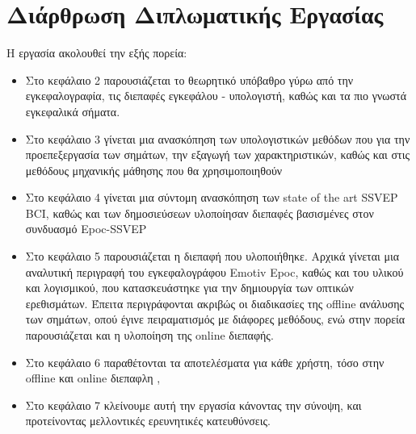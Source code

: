 \documentclass[11pt,a4paper,english,greek,twoside]{../Thesis}
\begin{document}
\section{Διάρθρωση Διπλωματικής Εργασίας}
\par Η εργασία ακολουθεί την εξής πορεία:
\begin{itemize}
	\item Στο κεφάλαιο 2 παρουσιάζεται το θεωρητικό υπόβαθρο γύρω από την εγκεφαλογραφία, τις διεπαφές εγκεφάλου - υπολογιστή, καθώς και τα πιο γνωστά εγκεφαλικά σήματα.
	\item Στο κεφάλαιο 3 γίνεται μια ανασκόπηση των υπολογιστικών μεθόδων που για την προεπεξεργασία των σημάτων, την εξαγωγή των χαρακτηριστικών, καθώς και στις μεθόδους μηχανικής μάθησης που θα χρησιμοποιηθούν
	\item Στο κεφάλαιο 4 γίνεται μια σύντομη ανασκόπηση των state of the art SSVEP BCI, καθώς και των δημοσιεύσεων υλοποίησαν διεπαφές βασισμένες στον συνδυασμό Epoc-SSVEP
	\item Στο κεφάλαιο 5 παρουσιάζεται η διεπαφή που υλοποιήθηκε. Αρχικά γίνεται μια αναλυτική περιγραφή του εγκεφαλογράφου Emotiv Epoc, καθώς και του υλικού και λογισμικού, που κατασκευάστηκε για την δημιουργία των οπτικών ερεθισμάτων. Έπειτα περιγράφονται ακριβώς οι διαδικασίες της offline ανάλυσης των σημάτων, οπού έγινε πειραματισμός με διάφορες μεθόδους, ενώ στην πορεία παρουσιάζεται και η υλοποίηση της online διεπαφής.
	\item Στο κεφάλαιο 6 παραθέτονται τα αποτελέσματα για κάθε χρήστη, τόσο στην offline και online διεπαφλη , 
	\item Στο κεφάλαιο 7 κλείνουμε αυτή την εργασία κάνοντας την σύνοψη, και προτείνοντας μελλοντικές ερευνητικές κατευθύνσεις. 
\end{itemize}
\end{document}
